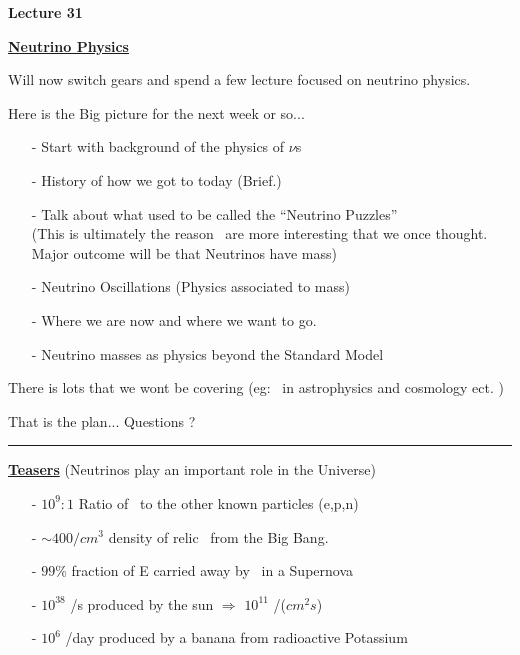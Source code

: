 \usepackage{fancyhdr}

\fancyhf{}


\thispagestyle{fancy}

\begin{center}
{\huge \textbf{Lecture 31}}
\end{center}

{\fontsize{14}{16}\selectfont

\textbf{\underline{Neutrino Physics}} 

Will now switch gears and spend a few lecture focused on neutrino physics. 

Here is the Big picture for the next week or so...

\begin{itemize}
\item[-] Start with background of the physics of $\nu$s
\item[-] History of how we got to today (Brief.)
\item[-] Talk about what used to be called the ``Neutrino Puzzles''\\
          (This is ultimately the reason \nus\ are more interesting that we once thought. Major outcome will be that Neutrinos have mass)
\item[-] Neutrino Oscillations (Physics associated to \nus mass)
\item[-] Where we are now and where we want to go.
\item[-] Neutrino masses as physics beyond the Standard Model\\
\end{itemize}

There is lots that we wont be covering (eg: \nus\ in astrophysics and cosmology ect. )

\vspace*{0.4in}

That is the plan... Questions ?

\vspace*{0.2in}

\noindent\rule{\textwidth}{1pt}

\textbf{\underline{Teasers}} (Neutrinos play an important role in the Universe)

\begin{itemize}
\item[-] $10^9:1$ Ratio of \nus\ to the other known particles (e,p,n)
\item[-] $\sim400/cm^3$ density of relic \nus\ from the Big Bang.
\item[-] $99\%$ fraction of E carried away by \nus\ in a Supernova
\item[-] $10^{38}$ \nus/s produced by the sun $\Rightarrow$ $10^{11}$ \nus/($cm^2s$)
\item[-] $10^6$ \nus/day produced by a banana from radioactive Potassium
\end{itemize}

}
